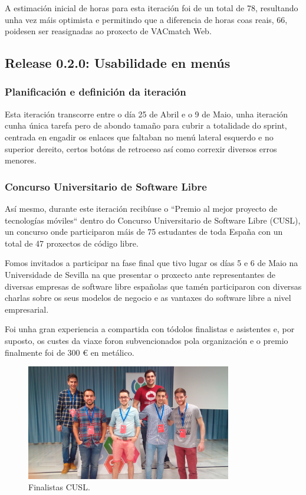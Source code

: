     A estimación inicial de horas para esta iteración foi de un total de 78, 
resultando unha vez máis optimista e permitindo que a diferencia de horas coas 
reais, 66, poidesen ser reasignadas ao proxecto de VACmatch Web.

    \subsection{Release 0.2.0: Usabilidade en menús}

      \subsubsection{Planificación e definición da iteración}
      Esta iteración transcorre entre o día 25 de Abril e o 9 de Maio, 
unha iteración cunha única tarefa pero de abondo tamaño para 
cubrir a totalidade do sprint, centrada en engadir os enlaces que faltaban no 
menú lateral esquerdo e no superior dereito, certos botóns de retroceso así
como correxir diversos erros menores.

      \subsubsection{Concurso Universitario de Software Libre}
      Así mesmo, durante este iteración recibíuse o ``Premio al mejor proyecto 
de tecnologías móviles`` dentro do Concurso Universitario de Software Libre 
(CUSL), un concurso onde participaron máis de 75 estudantes de toda España con 
un total de 47 proxectos de código libre.

      Fomos invitados a participar na fase final que tivo lugar os días 5 e 6 
de Maio na Universidade de Sevilla na que presentar o proxecto ante 
representantes de diversas empresas de software libre españolas que tamén 
participaron con diversas charlas sobre os seus modelos de negocio e as 
vantaxes do software libre a nivel empresarial.

      Foi unha gran experiencia a compartida con tódolos finalistas e 
asistentes e, por suposto, os custes da viaxe foron subvencionados pola 
organización e o premio finalmente foi de 300 \euro{} en metálico.

    \begin{figure}[h!]
          \begin{center}
            \includegraphics[width=0.8\textwidth]{./img/final_cusl.jpg}
            \caption{Finalistas CUSL.}
            \label{fig:cusl}
          \end{center}
    \end{figure}

